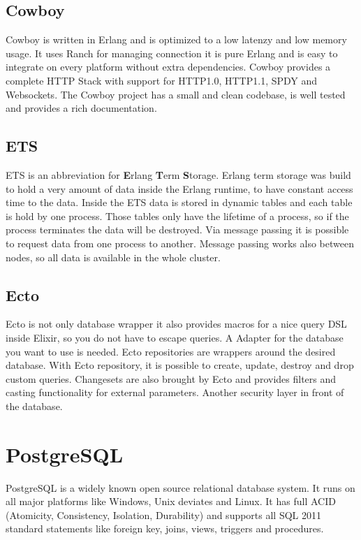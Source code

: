 \subsection{Cowboy}
Cowboy is written in Erlang and is optimized to a low latenzy and low memory usage. It uses Ranch for managing connection it is pure Erlang and is easy to integrate on every platform without extra dependencies. Cowboy provides a complete HTTP Stack with support for HTTP1.0, HTTP1.1, SPDY and Websockets. The Cowboy project has a small and clean codebase, is well tested and provides a rich documentation.

\subsection{ETS}
ETS is an abbreviation for \textbf{E}rlang \textbf{T}erm \textbf{S}torage. Erlang term storage was build to hold a very amount of data inside the Erlang runtime, to have constant access time to the data. Inside the ETS data is stored in dynamic tables and each table is hold by one process. Those tables only have the lifetime of a process, so if the process terminates the data will be destroyed. Via message passing it is possible to request data from one process to another. Message passing works also between nodes, so all data is available in the whole cluster. 

\subsection{Ecto}
Ecto is not only database wrapper it also provides macros for a nice query DSL inside Elixir, so you do not have to escape queries. A Adapter for the database you want to use is needed. Ecto repositories are wrappers around the desired database. With Ecto repository, it is possible to create, update, destroy and drop custom queries.  Changesets are also brought by Ecto and provides filters and casting functionality for external parameters. Another security layer in front of the database.

\section{PostgreSQL}
PostgreSQL is a widely known open source relational database system. It runs on all major platforms like Windows, Unix deviates and Linux. It has full ACID (Atomicity, Consistency, Isolation, Durability) and supports all SQL 2011 standard statements like foreign key, joins, views, triggers and procedures. 
